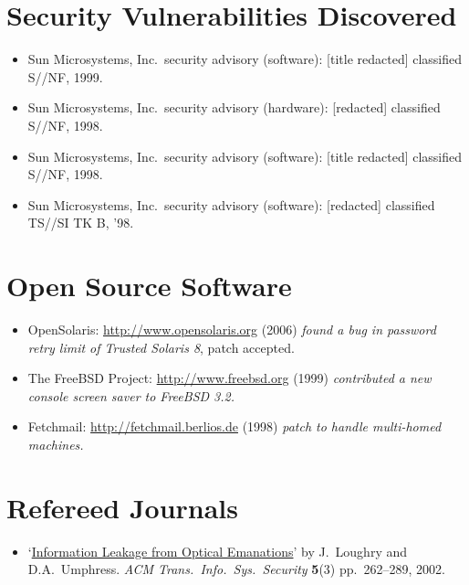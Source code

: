 \documentclass[12pt,twoside,letterpaper]{article}
\begin{document}
\section*{Security Vulnerabilities Discovered}
\vspace{-2mm}
\begin{itemize}
    \item Sun Microsystems, Inc.\ security advisory (software): [title redacted] classified S//NF,
		1999.
	\vspace{-2mm}
	\item Sun Microsystems, Inc.\ security advisory (hardware): [redacted] classified S//NF,
		1998.
	\vspace{-2mm}
	\item Sun Microsystems, Inc.\ security advisory (software): [title redacted] classified S//NF,
		1998.
	\vspace{-2mm}
	\item Sun Microsystems, Inc.\ security advisory (software): [redacted] classified TS//SI TK B,
		'98.
\end{itemize}


\section*{Open Source Software}
\vspace{-2mm}
\begin{itemize}
	\item OpenSolaris: \url{http://www.opensolaris.org} (2006) \emph{found a bug in password
		retry limit of Trusted Solaris 8}, patch accepted.
	\item The FreeBSD Project: \url{http://www.freebsd.org} (1999) \emph{contributed a new
		console screen saver to FreeBSD 3.2.}
	\item Fetchmail: \url{http://fetchmail.berlios.de} (1998) \emph{patch to handle multi-homed
		machines.}
\end{itemize}

\vspace{-8mm}
\section*{Refereed Journals}
\vspace{-2mm}
\begin{itemize}
    \item `\href{http://dl.acm.org/citation.cfm?doid=545186.545189}{Information Leakage
	from Optical Emanations}' by J.\ Loughry and D.A.\ Umphress. \emph{ACM
	Trans.\ Info.\ Sys.\ Security} \textbf{5}(3) pp.\ 262--289, 2002.
\end{itemize}
\end{document}
